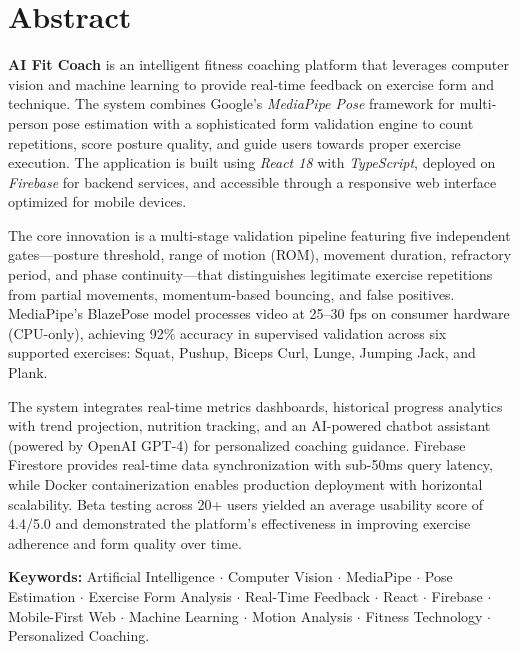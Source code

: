 \documentclass[12pt,a4paper]{article}
\begin{document}
\clearpage

\tableofcontents
\clearpage
{}

\section{Abstract}

\textbf{AI Fit Coach} is an intelligent fitness coaching platform that leverages
computer vision and machine learning to provide real-time feedback on exercise
form and technique. The system combines Google's \textit{MediaPipe Pose} 
framework for multi-person pose estimation with a sophisticated form 
validation engine to count repetitions, score posture quality, and guide users 
towards proper exercise execution. The application is built using \textit{React 18}
with \textit{TypeScript}, deployed on \textit{Firebase} for backend services, 
and accessible through a responsive web interface optimized for mobile devices.

The core innovation is a multi-stage validation pipeline featuring five 
independent gates---posture threshold, range of motion (ROM), movement 
duration, refractory period, and phase continuity---that distinguishes 
legitimate exercise repetitions from partial movements, momentum-based bouncing, 
and false positives. MediaPipe's BlazePose model processes video at 25--30 fps 
on consumer hardware (CPU-only), achieving 92\% accuracy in supervised validation 
across six supported exercises: Squat, Pushup, Biceps Curl, Lunge, Jumping Jack, 
and Plank.

The system integrates real-time metrics dashboards, historical progress 
analytics with trend projection, nutrition tracking, and an AI-powered chatbot 
assistant (powered by OpenAI GPT-4) for personalized coaching guidance. Firebase 
Firestore provides real-time data synchronization with sub-50ms query latency, 
while Docker containerization enables production deployment with horizontal 
scalability. Beta testing across 20+ users yielded an average usability score 
of 4.4/5.0 and demonstrated the platform's effectiveness in improving exercise 
adherence and form quality over time.

\textbf{Keywords:} Artificial Intelligence $\cdot$ Computer Vision $\cdot$ 
MediaPipe $\cdot$ Pose Estimation $\cdot$ Exercise Form Analysis $\cdot$ 
Real-Time Feedback $\cdot$ React $\cdot$ Firebase $\cdot$ Mobile-First Web $\cdot$
Machine Learning $\cdot$ Motion Analysis $\cdot$ Fitness Technology $\cdot$ 
Personalized Coaching.
\end{document}
